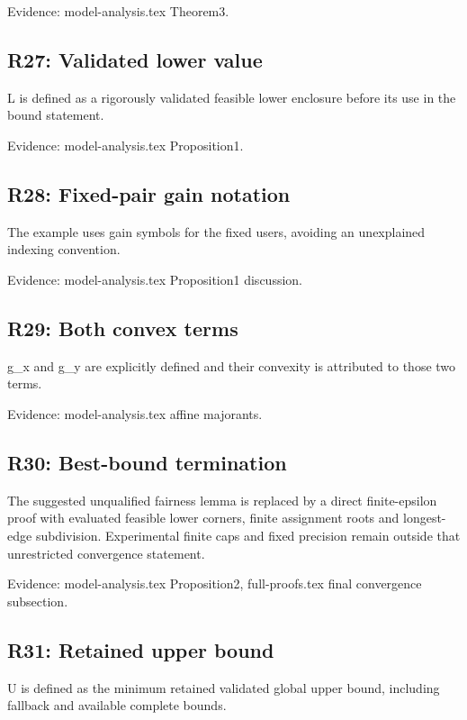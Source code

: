 \documentclass[10pt]{article}
\begin{document}
{\small Evidence: model-analysis.tex Theorem3.}

\subsection*{R27: Validated lower value}

L is defined as a rigorously validated feasible lower enclosure before its use in the bound statement.

{\small Evidence: model-analysis.tex Proposition1.}

\subsection*{R28: Fixed-pair gain notation}

The example uses gain symbols for the fixed users, avoiding an unexplained indexing convention.

{\small Evidence: model-analysis.tex Proposition1 discussion.}

\subsection*{R29: Both convex terms}

g\_\allowbreak x and g\_\allowbreak y are explicitly defined and their convexity is attributed to those two terms.

{\small Evidence: model-analysis.tex affine majorants.}

\subsection*{R30: Best-bound termination}

The suggested unqualified fairness lemma is replaced by a direct finite-epsilon proof with evaluated feasible lower corners, finite assignment roots and longest-edge subdivision. Experimental finite caps and fixed precision remain outside that unrestricted convergence statement.

{\small Evidence: model-analysis.tex Proposition2, full-proofs.tex final convergence subsection.}

\subsection*{R31: Retained upper bound}

U is defined as the minimum retained validated global upper bound, including fallback and available complete bounds.
\end{document}
